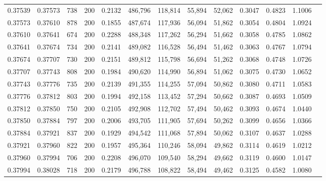 \begin{tabular}{rrrrrrrrrrrrr}
0.37539 & 0.37573 &   738 & 200 &                                     0.2132 & 486,796 & 118,814 &  55,894 &  52,062 & 0.3047 & 0.4823 & 1.1006 \\
0.37573 & 0.37610 &   878 & 200 &                                     0.1855 & 487,674 & 117,936 &  56,094 &  51,862 & 0.3054 & 0.4804 & 1.0924 \\
0.37610 & 0.37641 &   674 & 200 &                                     0.2288 & 488,348 & 117,262 &  56,294 &  51,662 & 0.3058 & 0.4785 & 1.0862 \\
0.37641 & 0.37674 &   734 & 200 &                                     0.2141 & 489,082 & 116,528 &  56,494 &  51,462 & 0.3063 & 0.4767 & 1.0794 \\
0.37674 & 0.37707 &   730 & 200 &                                     0.2151 & 489,812 & 115,798 &  56,694 &  51,262 & 0.3068 & 0.4748 & 1.0726 \\
0.37707 & 0.37743 &   808 & 200 &                                     0.1984 & 490,620 & 114,990 &  56,894 &  51,062 & 0.3075 & 0.4730 & 1.0652 \\
0.37743 & 0.37776 &   735 & 200 &                                     0.2139 & 491,355 & 114,255 &  57,094 &  50,862 & 0.3080 & 0.4711 & 1.0583 \\
0.37776 & 0.37812 &   803 & 200 &                                     0.1994 & 492,158 & 113,452 &  57,294 &  50,662 & 0.3087 & 0.4693 & 1.0509 \\
0.37812 & 0.37850 &   750 & 200 &                                     0.2105 & 492,908 & 112,702 &  57,494 &  50,462 & 0.3093 & 0.4674 & 1.0440 \\
0.37850 & 0.37884 &   797 & 200 &                                     0.2006 & 493,705 & 111,905 &  57,694 &  50,262 & 0.3099 & 0.4656 & 1.0366 \\
0.37884 & 0.37921 &   837 & 200 &                                     0.1929 & 494,542 & 111,068 &  57,894 &  50,062 & 0.3107 & 0.4637 & 1.0288 \\
0.37921 & 0.37960 &   822 & 200 &                                     0.1957 & 495,364 & 110,246 &  58,094 &  49,862 & 0.3114 & 0.4619 & 1.0212 \\
0.37960 & 0.37994 &   706 & 200 &                                     0.2208 & 496,070 & 109,540 &  58,294 &  49,662 & 0.3119 & 0.4600 & 1.0147 \\
0.37994 & 0.38028 &   718 & 200 &                                     0.2179 & 496,788 & 108,822 &  58,494 &  49,462 & 0.3125 & 0.4582 & 1.0080 \\

\end{tabular}

